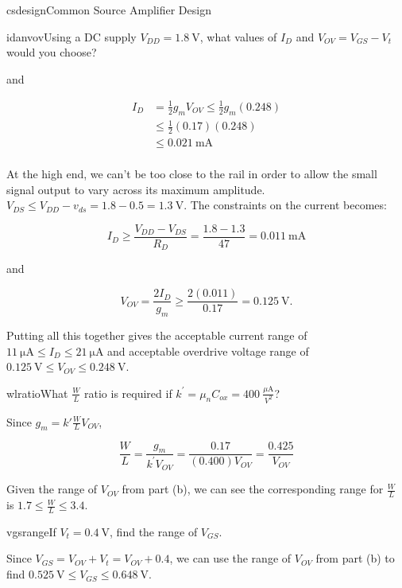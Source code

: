 \begin{mainquestion}{csdesign}{Common Source Amplifier Design}
\begin{partquestion}{idanvov}{Using a DC supply $V_{DD} = \qty{1.8}{\volt}$, what values of $I_{D}$ and $V_{OV} = V_{GS} - V_{t}$ would you choose?}
\begin{answer}
and

\begin{align*}
    I_D &= \frac{1}{2} g_m V_{OV} \leq \frac{1}{2} g_m (0.248) \\
    &\leq \frac{1}{2} (0.17)(0.248) \\
    &\leq \qty{0.021}{\milli\ampere} \\
\end{align*}

At the high end, we can't be too close to the rail in order to allow the small signal output to vary across its maximum amplitude. $V_{DS} \leq V_{DD} - v_{ds} = 1.8 - 0.5 = \qty{1.3}{\volt}$. The constraints on the current becomes:

\[
I_{D} \geq \frac{V_{DD} - V_{DS}}{R_{D}} = \frac{1.8 - 1.3}{47} = \qty{0.011}{\milli\ampere}
\]

and

\[
V_{OV} = \frac{2I_{D}}{g_{m}} \geq \frac{2(0.011)}{0.17} = \qty{0.125}{\volt}.
\]

Putting all this together gives the acceptable current range of $\qty{11}{\micro\ampere} \leq I_{D} \leq \qty{21}{\micro\ampere}$ and acceptable overdrive voltage range of $\qty{0.125}{\volt} \leq V_{OV} \leq \qty{0.248}{\volt}$.
\end{answer}
\end{partquestion}

\begin{partquestion}{wlratio}{What $\frac{W}{L}$ ratio is required if $k^{\prime} = \mu_{n} C_{ox} = 400\ \frac{\mu\text{A}}{V^{2}}$?}
\begin{answer}
Since $g_{m} = k'\frac{W}{L}V_{OV}$,

\[
\frac{W}{L} = \frac{g_{m}}{k^{\prime} V_{OV}} = \frac{0.17}{(0.400)V_{OV}} = \frac{0.425}{V_{OV}}
\]

Given the range of $V_{OV}$ from part (b), we can see the corresponding range for $\frac{W}{L}$ is $1.7 \leq \frac{W}{L} \leq 3.4$.
\end{answer}
\end{partquestion}

\begin{partquestion}{vgsrange}{If $V_{t} = \qty{0.4}{\volt}$, find the range of $V_{GS}$.}
\begin{answer}
Since $V_{GS} = V_{OV} + V_{t} = V_{OV} + 0.4$, we can use the range of $V_{OV}$ from part (b) to find $\qty{0.525}{\volt} \leq V_{GS} \leq \qty{0.648}{\volt}$.
\end{answer}
\end{partquestion}

\end{mainquestion}
